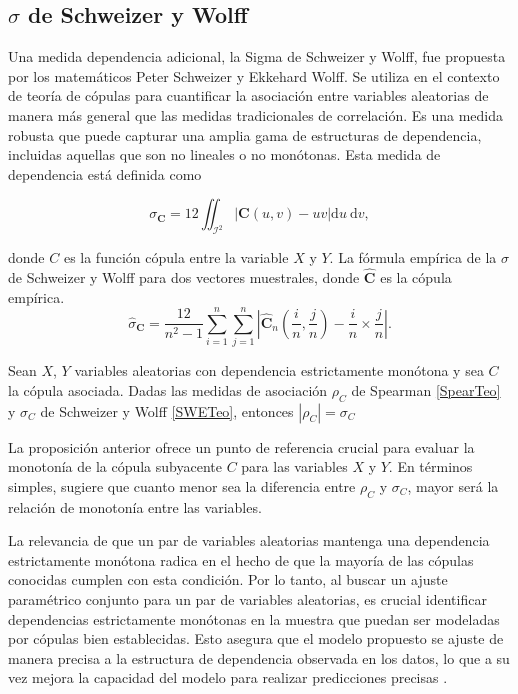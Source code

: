 \subsection{$\sigma$ de Schweizer y Wolff}

Una medida dependencia adicional, la Sigma de Schweizer y Wolff, fue propuesta por los matemáticos Peter Schweizer y Ekkehard Wolff. Se utiliza en el contexto de teoría de cópulas para cuantificar la asociación entre variables aleatorias de manera más general que las medidas tradicionales de correlación. Es una medida robusta que puede capturar una amplia gama de estructuras de dependencia, incluidas aquellas que son no lineales o no monótonas. Esta medida de dependencia está definida como

\begin{equation}\label{SWETeo}
    \sigma_{\mathbf{C}}=12 \iint_{\mathcal{I}^2}|\mathbf{C}(u, v)-u v| \mathrm{d} u \mathrm{~d} v,
\end{equation}

donde $C$ es la función cópula entre la variable $X$ y $Y$.
La fórmula empírica de la $\sigma$ de Schweizer y Wolff para dos vectores muestrales, donde $\hat{\mathbf{C}}$ es la cópula empírica. 
\begin{equation}\label{SWEemp}
    \hat{\sigma}_{\mathbf{C}}=\frac{12}{n^2-1} \sum_{i=1}^n \sum_{j=1}^n\left|\hat{\mathbf{C}}_n\left(\frac{i}{n}, \frac{j}{n}\right)-\frac{i}{n} \times \frac{j}{n}\right|.
\end{equation}


\begin{propo}
    Sean $X$, $Y$ variables aleatorias con dependencia estrictamente monótona y sea $C$ la cópula asociada. Dadas las medidas de asociación $\rho_C$ de Spearman \eqref{SpearTeo} y $\sigma_C$ de Schweizer y Wolff \eqref{SWETeo}, entonces $|\rho_C| = \sigma_C$
\end{propo}

La proposición anterior ofrece un punto de referencia crucial para evaluar la monotonía de la cópula subyacente $C$ para las variables $X$ y $Y$. En términos simples, sugiere que cuanto menor sea la diferencia entre $\rho_C$ y $\sigma_C$, mayor será la relación de monotonía entre las variables.

La relevancia de que un par de variables aleatorias mantenga una dependencia estrictamente monótona radica en el hecho de que la mayoría de las cópulas conocidas cumplen con esta condición. Por lo tanto, al buscar un ajuste paramétrico conjunto para un par de variables aleatorias, es crucial identificar dependencias estrictamente monótonas en la muestra que puedan ser modeladas por cópulas bien establecidas. Esto asegura que el modelo propuesto se ajuste de manera precisa a la estructura de dependencia observada en los datos, lo que a su vez mejora la capacidad del modelo para realizar predicciones precisas \cite[pág. 43]{TesisEmanuel}.


